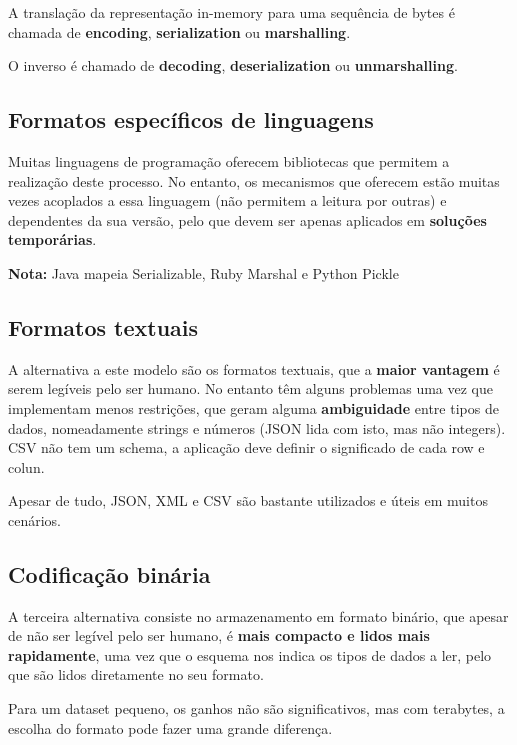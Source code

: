 \documentclass{article}
\begin{document}
A translação da representação in-memory para uma sequência de bytes é chamada de
\textbf{encoding}, \textbf{serialization} ou \textbf{marshalling}.

O inverso é chamado de \textbf{decoding}, \textbf{deserialization} ou \textbf{unmarshalling}.

\pagebreak

\subsection{Formatos específicos de linguagens}

Muitas linguagens de programação oferecem bibliotecas que permitem a realização deste
processo. No entanto, os mecanismos que oferecem estão muitas vezes acoplados a essa
linguagem (não permitem a leitura por outras) e dependentes da sua versão, pelo que devem
ser apenas aplicados em \textbf{soluções temporárias}.

\begin{flushleft}
  \textbf{Nota:} Java mapeia
  Serializable, Ruby
  Marshal e Python
  Pickle
\end{flushleft}

\subsection{Formatos textuais}

A alternativa a este modelo são os formatos textuais, que a \textbf{maior vantagem} é serem legíveis pelo ser
humano. No entanto têm alguns problemas uma vez que implementam menos restrições, que
geram alguma \textbf{ambiguidade} entre tipos de dados, nomeadamente
strings e números (JSON lida com isto, mas não integers).
CSV não tem um schema, a aplicação deve definir o significado de cada row e colun.

Apesar de tudo, JSON, XML e CSV são bastante utilizados e úteis em muitos cenários.

\subsection{Codificação binária}

A terceira alternativa consiste no armazenamento em formato binário, que apesar de não ser
legível pelo ser humano, é \textbf{mais compacto e lidos mais rapidamente}, uma vez que o esquema
nos indica os tipos de dados a ler, pelo que são lidos diretamente no seu formato.

Para um dataset pequeno, os ganhos não são significativos, mas com terabytes,
a escolha do formato pode fazer uma grande diferença.
\end{document}
